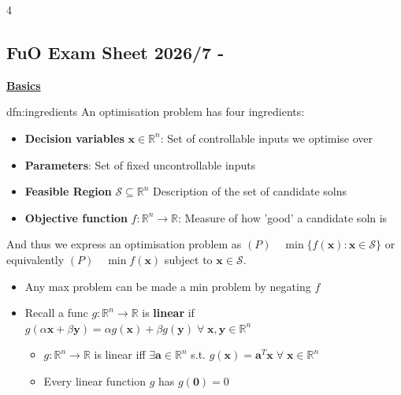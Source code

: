 \documentclass[landscape, 8pt]{extarticle}
\begin{document}
\begin{multicols*}{4}
	\raggedcolumns 
	\vspace{-5pt}
	\subsection*{FuO Exam Sheet 2026/7 - }
	\vspace{-5pt}
	

{\footnotesize \textbf{\underline{Basics}}}
		
		
		\begin{dfn}[Ingredients]{dfn:ingredients}{ }
			An optimisation problem has four ingredients:
			\begin{itemize}
				\item \textbf{Decision variables} $\mathbf{x}\in \mathbb{R}^n$: Set of controllable inputs we optimise over
				\item \textbf{Parameters}: Set of fixed uncontrollable inputs 
				\item \textbf{Feasible Region} $\mathcal{S} \subseteq\mathbb{R}^n$ Description of the set of candidate solns
				\item \textbf{Objective function} $f: \mathbb{R}^n \to \mathbb{R}$: Measure of how 'good' a candidate soln is
			\end{itemize}
			And thus we express an optimisation problem as $(P) \quad \min \{f(\mathbf{x}) : \mathbf{x}\in \mathcal{S}\}$ or equivalently $(P) \quad \min f(\mathbf{x})$ subject to $\mathbf{x}\in \mathcal{S}$.
			\begin{itemize}
				\item Any max problem can be made a min problem by negating $f$
				\item Recall a func $g: \mathbb{R}^n \to \mathbb{R}$ is \textbf{linear} if $g(\alpha \mathbf{x} + \beta \mathbf{y}) = \alpha g(\mathbf{x}) + \beta g(\mathbf{y}) \; \forall \; \mathbf{x, y}\in \mathbb{R}^n$
				\begin{itemize}
					\item $g: \mathbb{R}^n \to \mathbb{R}$ is linear iff $\exists \mathbf{a}\in \mathbb{R}^n$ s.t. $g(\mathbf{x}) = \mathbf{a}^T \mathbf{x} \; \forall \; \mathbf{x}\in \mathbb{R}^n$
					\item Every linear function $g$ has $g(\mathbf{0}) = 0$
				\end{itemize}
			\end{itemize}
			

\end{dfn}
\end{multicols*}
\end{document}
